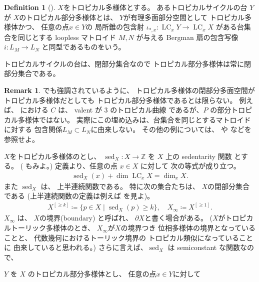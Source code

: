 \documentclass[a4paper,dvipdfmx,reqno,12pt]{amsart}
\theoremstyle{definition}
\newtheorem{definition}[theorem]{Definition}
\newtheorem{remark}[theorem]{Remark}
\newcommand{\deq}{\coloneqq}
\newcommand{\opn}[1]{\operatorname{#1}}
\numberwithin{equation}{section}
\begin{document}
\begin{definition}[{\cite[Definition 2.14]{demedrano2023chern}}]
$X$をトロピカル多様体とする。
あるトロピカルサイクルの台 $Y$ が
$X$のトロピカル部分多様体とは、
$Y$が有理多面部分空間として
トロピカル多様体かつ、
任意の点$x\in Y$の
局所錐の包含射
$\iota_{*,x}\colon \opn{LC}_x Y\to 
\opn{LC}_x X$
がある台集合を同じとする loopless マトロイド
$M,N$ が与える Bergman 扇の包含写像
$i \colon L_M\to L_N$
と同型であるものをいう。
\end{definition}

トロピカルサイクルの台は、閉部分集合なので
トロピカル部分多様体は常に閉部分集合である。

\begin{remark}
\cite[Example 2.15]{demedrano2023chern}でも強調されているように、
トロピカル多様体の閉部分多面空間がトロピカル多様体だとしても
トロピカル部分多様体であるとは限らない。
例えば、
\cite[Example 2.21]{shaw2015tropical}
における $C$ は、 valent が $3$ のトロピカル曲線
であるが、$P$ の部分トロピカル多様体ではない。
実際にこの埋め込みは、台集合を同じとするマトロイドに対する
包含関係$L_M\subset L_N$に由来しない。
その他の例については、
\cite{MR2594592} や \cite{MR3339531}
などを参照せよ。


\end{remark}

$X$をトロピカル多様体のとし、
$\opn{sed}_X\colon 
X\to \mathbb{Z}$ を
$X$ 上の sedentarity 関数
\cite[Definition 7.2.6]{mikhalkin2018tropical}
とする。
(\cite[Definition 2.4]{demedrano2023chern}
もみよ。)
定義より、任意の点 $x\in X$ に対して
次の等式が成り立つ。
\begin{align}
\opn{sed}_X(x)+\dim \opn{LC}_x X=\dim_x X.
\end{align}
また $\opn{sed}_X$ は、
上半連続関数である。
特に次の集合たちは、
$X$の閉部分集合である
(上半連続関数の定義は例えば\cite[p.287]{MR463157}
を見よ)。
\begin{align}
X^{[\geq k]}\deq \{p\in X\mid \opn{sed}_X(p)\geq k\},
\quad 
X_{\infty}\deq X^{[\geq 1]}.
\end{align}
$X_{\infty}$ は、
$X$の境界(boundary)
と呼ばれ、
$\partial X$と書く場合がある。
($X$がトロピカルトーリック多様体のとき、
$X_{\infty}$が$X$の境界つき
位相多様体の境界となっていることと、
代数幾何におけるトーリック境界の
トロピカル類似になっていることに
由来していると思われる。)
さらに言えば、$\opn{sed}_X$ は
semiconstant な関数なので、




$Y$ を $X$ 
のトロピカル部分多様体とし、
任意の点$x\in Y$に対して
\end{document}
